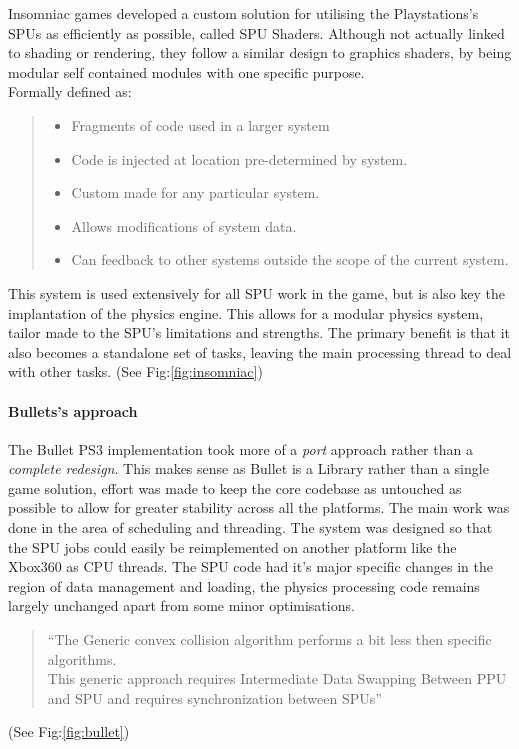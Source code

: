 \documentclass[conference]{acmsiggraph}
\begin{document}
Insomniac games developed a custom solution for utilising the Playstations's SPUs as efficiently as possible, called SPU Shaders. Although not actually linked to shading or rendering, they follow a similar design to graphics shaders, by being modular self contained modules with one specific purpose.\\
Formally defined as:
\begin{quote}
\begin{itemize}
  \item Fragments of code used in a larger system
  \item Code is injected at location pre-determined by
system.
  \item Custom made for any particular system.
  \item Allows modifications of system data.
  \item Can feedback to other systems outside the scope of the current system.
\end{itemize}
\cite{spushaders}
\end{quote}

This system is used extensively for all SPU work in the game, but is also key the implantation of the physics engine. This allows for a modular physics system, tailor made to the SPU's limitations and strengths. The primary benefit is that it also becomes a standalone set of tasks, leaving the main processing thread to deal with other tasks.
(See Fig:\ref{fig:insomniac})

\paragraph{Bullets's approach}
The Bullet PS3 implementation took more of a \textit{port} approach rather than a \textit{complete redesign}. This makes sense as Bullet is a Library rather than a single game solution, effort was made to keep the core codebase as untouched as possible to allow for greater stability across all the platforms. The main work was done in the area of scheduling and threading. The system was designed so that the SPU jobs could easily be reimplemented on another platform like the Xbox360 as CPU threads. The SPU code had it's major specific changes in the region of data management and loading, the physics processing code remains largely unchanged apart from some minor optimisations.
\begin{quote}
``The Generic convex collision algorithm performs a bit less then specific algorithms.\\
This generic approach requires Intermediate Data Swapping Between PPU and SPU and requires synchronization between SPUs''
\cite{spuphys}
\end{quote}
(See Fig:\ref{fig:bullet})
\end{document}
